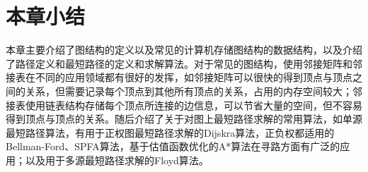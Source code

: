 \section{本章小结}
\par{\kaishu 本章主要介绍了图结构的定义以及常见的计算机存储图结构的数据结构，以及介绍了路径定义和最短路径的定义和求解算法。对于常见的图结构，使用邻接矩阵和邻接表在不同的应用领域都有很好的发挥，如邻接矩阵可以很快的得到顶点与顶点之间的关系，但需要记录每个顶点到其他所有顶点的关系，占用的内存空间较大；邻接表使用链表结构存储每个顶点所连接的边信息，可以节省大量的空间，但不容易得到顶点与顶点的关系。随后介绍了关于对图上最短路径求解的常用算法，如单源最短路径算法，有用于正权图最短路径求解的Dijskra算法，正负权都适用的Bellman-Ford、SPFA算法，基于估值函数优化的A*算法在寻路方面有广泛的应用；以及用于多源最短路径求解的Floyd算法。}